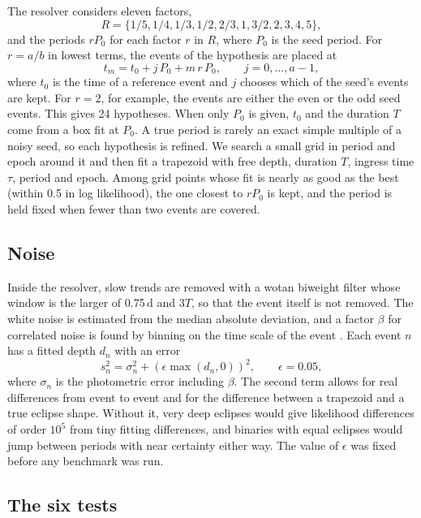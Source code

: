 \documentclass[twocolumn,linenumbers]{aastex701}
\newcommand{\Pz}{P_0}
\begin{document}
The resolver considers eleven factors,
\begin{equation}
R = \{1/5, 1/4, 1/3, 1/2, 2/3, 1, 3/2, 2, 3, 4, 5\},
\end{equation}
and the periods $r\Pz$ for each factor $r$ in $R$, where $\Pz$ is the seed period. For $r = a/b$ in lowest terms, the events of the hypothesis are placed at
\begin{equation}
t_m = t_0 + j\,\Pz + m\,r\,\Pz, \qquad j = 0, \ldots, a-1,
\end{equation}
where $t_0$ is the time of a reference event and $j$ chooses which of the seed's events are kept. For $r=2$, for example, the events are either the even or the odd seed events. This gives 24 hypotheses. When only $\Pz$ is given, $t_0$ and the duration $T$ come from a box fit at $\Pz$. A true period is rarely an exact simple multiple of a noisy seed, so each hypothesis is refined. We search a small grid in period and epoch around it and then fit a trapezoid with free depth, duration $T$, ingress time $\tau$, period and epoch. Among grid points whose fit is nearly as good as the best (within 0.5 in log likelihood), the one closest to $r\Pz$ is kept, and the period is held fixed when fewer than two events are covered.

\subsection{Noise}

Inside the resolver, slow trends are removed with a wotan biweight filter whose window is the larger of 0.75\,d and $3T$, so that the event itself is not removed. The white noise is estimated from the median absolute deviation, and a factor $\beta$ for correlated noise is found by binning on the time scale of the event \citep{Pont2006}. Each event $n$ has a fitted depth $d_n$ with an error
\begin{equation}
s_n^2 = \sigma_n^2 + (\epsilon \max(d_n,0))^2, \qquad \epsilon = 0.05,
\end{equation}
where $\sigma_n$ is the photometric error including $\beta$. The second term allows for real differences from event to event and for the difference between a trapezoid and a true eclipse shape. Without it, very deep eclipses would give likelihood differences of order $10^5$ from tiny fitting differences, and binaries with equal eclipses would jump between periods with near certainty either way. The value of $\epsilon$ was fixed before any benchmark was run.

\subsection{The six tests} \label{sec:features}
\end{document}
